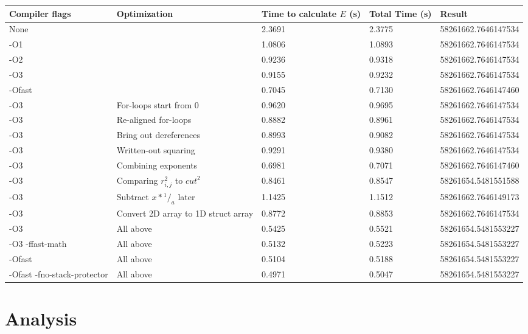 \documentclass[12pt]{article}
\begin{document}
	\singlespacing
	\begin{center}
	\begin{tabular}{| p{3cm} | p{4cm} | p{1.5cm} | p{1.5cm} | l |}
	\hline
	Compiler flags & Optimization & Time to calculate $E$ (s) & Total Time (s) & Result \\ \hline
	None & & 2.3691 & 2.3775 & 58261662.7646147534 \\ \hline
	-O1 & & 1.0806 & 1.0893 & 58261662.7646147534 \\ \hline
	-O2 & & 0.9236 & 0.9318 & 58261662.7646147534 \\ \hline
	-O3 & & 0.9155 & 0.9232 & 58261662.7646147534 \\ \hline
	-Ofast & & 0.7045 & 0.7130 & 58261662.7646147460 \\ \hline
	-O3 & For-loops start from 0 & 0.9620 & 0.9695 & 58261662.7646147534 \\ \hline
	-O3 & Re-aligned for-loops & 0.8882 & 0.8961 & 58261662.7646147534 \\ \hline
	-O3 & Bring out dereferences & 0.8993 & 0.9082 & 58261662.7646147534 \\ \hline
	-O3 & Written-out squaring & 0.9291 & 0.9380 & 58261662.7646147534 \\ \hline
	-O3 & Combining exponents & 0.6981 & 0.7071 & 58261662.7646147460 \\ \hline
	-O3 & Comparing $r_{i,j}^2$ to $cut^2$ & 0.8461 & 0.8547 & 58261654.5481551588 \\ \hline
	-O3 & Subtract $x*{^1/_a}$ later & 1.1425 & 1.1512 & 58261662.7646149173 \\ \hline
	-O3 & Convert 2D array to 1D struct array & 0.8772 & 0.8853 & 58261662.7646147534 \\ \hline
	-O3 & All above & 0.5425 & 0.5521 & 58261654.5481553227 \\ \hline
	-O3 -ffast-math & All above & 0.5132 & 0.5223 & 58261654.5481553227 \\ \hline
	-Ofast & All above & 0.5104 & 0.5188 & 58261654.5481553227 \\ \hline
	-Ofast -fno-stack-protector & All above & 0.4971 & 0.5047 & 58261654.5481553227 \\ \hline
	\end{tabular}
	\end{center}
	\doublespacing

	\section{Analysis}
\end{document}

